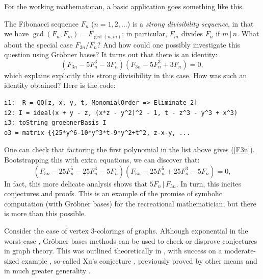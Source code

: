 
For the working mathematician, a basic application goes something like this.

The Fibonacci sequence $F_n$ ($n= 1, 2, \ldots$) is a \textit{strong divisibility sequence}, in that we have $\gcd(F_n, F_m) = F_{\gcd(n,m)}$; in particular, $F_m$ divides $F_n$ if $m \, | \, n$.  What about the special case $F_{3n}/F_n$?  And how could one possibly investigate this question using Gr\"obner bases?  It turns out that there is an identity:
\begin{equation}\label{F3n}
(F_{3n} - 5 F_n^3 - 3 F_n)(F_{3n} - 5 F_n^3 + 3 F_n) = 0,
\end{equation}
which explains explicitly this strong divisibility in this case.  How was such an identity obtained?  Here is the code:
\begin{M2}
\begin{verbatim}
i1:  R = QQ[z, x, y, t, MonomialOrder => Eliminate 2]
i2: I = ideal(x + y - z, (x*z - y^2)^2 - 1, t - z^3 - y^3 + x^3)
i3: toString groebnerBasis I
o3 = matrix {{25*y^6-10*y^3*t-9*y^2+t^2, z-x-y, ...
\end{verbatim}
\end{M2}  
\medskip
One can check that factoring the first polynomial in the list above gives (\ref{F3n}).  Bootstrapping this with extra equations, we can discover that:
\begin{equation}\label{F5n}
(F_{5n} - 25 F_n^5 - 25 F_n^3 - 5 F_n)(F_{5n} - 25 F_n^5 + 25 F_n^3 - 5 F_n) = 0,
\end{equation}
In fact, this more delicate analysis shows that $5F_n \, | \, F_{5n}$.  In turn, this incites conjectures and proofs.  This is an example of the promise of symbolic computation (with Gr\"obner bases) for the recreational mathematician, but there is more than this possible.

Consider the case of vertex 3-colorings of graphs.  Although exponential in the worst-case \cite[pp. 400]{yap2000fundamental}, Gr\"obner bases methods can be used to check or disprove conjectures in graph theory.  This was outlined theoretically in \cite{bayer1982division}, with success on a moderate-sized example \cite{hillar2008algebraic}, so-called Xu's conjecture \cite{shaoji1990size}, previously proved by other means and in much greater generality \cite{akbari2001kr}.

